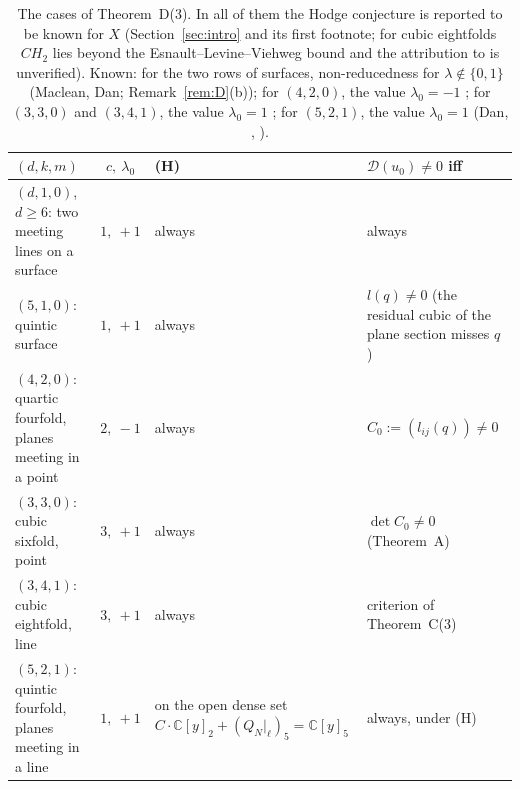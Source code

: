 \documentclass[10pt]{article}
\numberwithin{equation}{section}
\theoremstyle{remark}
\newcommand{\CC}{\mathbb{C}}
\newcommand{\cD}{\mathcal{D}}
\newcommand{\rg}{\raggedright}
\begin{document}
\begin{table}[t]
\centering\footnotesize
\begin{tabular}{@{}p{}cp{}p{}@{}}
\toprule
$(d,k,m)$ & $c,\ \lambda_0$ & (H) & $\cD(u_0)\neq0$ iff\\
\midrule
\rg $(d,1,0)$, $d\ge6$: two meeting lines on a surface & $1,\ +1$ & always & always\\
\rg $(5,1,0)$: quintic surface & $1,\ +1$ & always & \rg $l(q)\neq0$ (the residual cubic of the plane section misses $q$)\tabularnewline
\rg $(4,2,0)$: quartic fourfold, planes meeting in a point & $2,\ -1$ & always & \rg $C_0:=(l_{ij}(q))\neq0$\tabularnewline
\rg $(3,3,0)$: cubic sixfold, point & $3,\ +1$ & always & $\det C_0\ne0$ (Theorem~A)\\
\rg $(3,4,1)$: cubic eightfold, line & $3,\ +1$ & always & criterion of Theorem~C(3)\\
\rg $(5,2,1)$: quintic fourfold, planes meeting in a line & $1,\ +1$ & \rg on the open dense set
 $C\cdot\CC[y]_2+(Q_N|_\ell)_5=\CC[y]_5$ & always, under (H)\\
\bottomrule
\end{tabular}
\caption{The cases of Theorem~D(3). In all of them the Hodge conjecture is reported to be known for $X$
(Section~\ref{sec:intro} and its first footnote; for cubic eightfolds $CH_2$ lies beyond the
Esnault--Levine--Viehweg bound and the attribution to \cite{Ot} is unverified). Known: for the two rows of
surfaces, non-reducedness for $\lambda\notin\{0,1\}$ (Maclean, Dan; Remark~\ref{rem:D}(b)); for $(4,2,0)$, the
value $\lambda_0=-1$ \cite[Prop.~6.1, Cor.~6.2]{Kl1}; for $(3,3,0)$ and $(3,4,1)$, the value $\lambda_0=1$
\cite[Prop.~6.4, Cor.~6.5]{Kl1}; for $(5,2,1)$, the value $\lambda_0=1$ (Dan, \cite[Thm 5]{Mo1},
\cite{Kl2}).}\label{tab:G}
\end{table}
\end{document}
